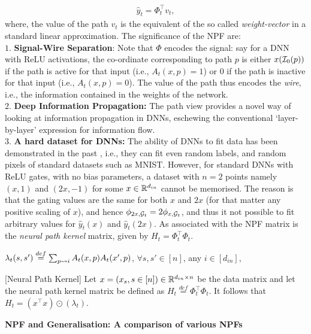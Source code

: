 \begin{align}\label{eq:npfbasic}
\hat{y}_t=\Phi_t^\top v_t,
\end{align}
where, the value of the path $v_t$ is the equivalent of the so called \emph{weight-vector} in a standard linear approximation. 
The significance of the NPF are:\hfill\\
$1.$ \textbf{Signal-Wire Separation}: Note that $\Phi$ encodes the signal: say for a DNN with ReLU activations, the co-ordinate corresponding to path $p$ is either $x(\mathcal{I}_0(p))$ if the path is active for that input (i.e., $A_t(x,p)=1$) or $0$ if the path is inactive for that input  (i.e., $A_t(x,p)=0$). The value of the path thus encodes the \emph{wire}, i.e., the information contained in the weights of the network. \hfill\\
$2.$ \textbf{Deep Information Propagation:} The path view provides a novel way of looking at information propagation in DNNs, eschewing the conventional `layer-by-layer' expression for information flow.\hfill\\
$3.$ \textbf{A hard dataset for DNNs:} The ability of DNNs to fit data has been demonstrated in the past \cite{ben}, i.e., they can fit even random labels, and random pixels of standard datasets such as MNIST. %
However, for standard DNNs with ReLU gates, with no bias parameters, a dataset with $n=2$ points namely $(x,1)$ and $(2x,-1)$ for some $x\in \mathbb{R}^{d_{in}}$ cannot be memorised. The reason is that the gating values are the same for both $x$ and $2x$ (for that matter any positive scaling of $x$), and hence $\phi_{2x,\mathcal{G}_t }= 2\phi_{x,\mathcal{G}_t }$, and thus it not possible to fit arbitrary values for $\hat{y}_t(x)$ and $\hat{y}_t(2x)$. 
As associated with the NPF matrix is the \emph{neural path kernel} matrix, given by $H_t=\Phi^\top_t\Phi_t$. 
\begin{definition}\label{def:lambda}
$\lambda_t(s,s')\stackrel{def}{=}\sum_{p\rightsquigarrow i} A_t(x,p) A_t(x',p)$, $\forall s,s'\in[n]$, any $i\in [d_{in}]$,  
 \end{definition} 
\begin{lemma}\label{lm:npk}[Neural Path Kernel] 
Let $x=(x_s,s\in [n])\in\mathbb{R}^{d_{in}\times n}$ be the data matrix and let the neural path kernel matrix be defined as $H_t\stackrel{def}=\Phi^\top_t\Phi_t$. It follows that $H_t= (x^\top x)\odot(\lambda_t)$. 
\end{lemma}
\begin{center}
\textbf{NPF and Generalisation: A comparison of various NPFs}
 \end{center}
